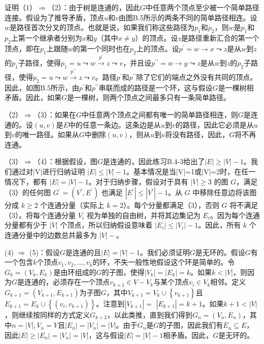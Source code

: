 \documentclass[lang=cn,newtx,10pt,scheme=chinese]{elegantbook}
\begin{document}
证明（1）$\Rightarrow$（2）：由于树是连通的，因此$G$中任意两个顶点至少被一个简单路径连接。假设为了推导矛盾，顶点$u$和$v$由图B.5所示的两条不同的简单路径相连。设$w$是路径首次分叉的顶点。也就是说，如果我们称这些路径为$p_1$和$p_2$，则$w$是$p_1$和$p_2$上第一个继承者分别为$x$和$y$（其中$x \neq y$）的顶点。设$z$是路径重新汇合的第一个顶点，即在$p_1$上跟随$w$的第一个同时也在$p_2$上的顶点。设$p^{\prime}=w \rightarrow x \leadsto z$是从$w$到$z$的$p_1$子路径，使得$p_1=u \leadsto w \stackrel{p^{\prime}}{\rightarrow} z \leadsto v$，并且设$p^{\prime \prime}=w \rightarrow y \leadsto z$是从$w$到$z$的$p_2$子路径，使得$p_2=u \leadsto w \stackrel{p^{\prime \prime}}{\rightarrow} z \leadsto v$。路径$p^{\prime}$和$p^{\prime \prime}$除了它们的端点之外没有共同的顶点。因此，如图B.5所示，由$p^{\prime}$和$p^{\prime \prime}$串联而成的路径是一个环，这与假设$G$是一棵树相矛盾。因此，如果$G$是一棵树，则两个顶点之间最多只有一条简单路径。

（2）$\Rightarrow$（3）：如果在$G$中任意两个顶点之间都有唯一的简单路径相连，则$G$是连通的。设$(u,v)$是$E$中的任意一条边。这条边是从$u$到$v$的路径，因此它必须是从$u$到$v$的唯一路径。如果从$G$中删除$(u,v)$，则从$u$到$v$将没有路径，因此，$G$将不再连通。

（3）$\Rightarrow$（4）：根据假设，图$G$是连通的，因此练习B.4-3给出了$|E| \geq|V|-1$。我们通过对|V|进行归纳证明 $|E| \leq|V|-1$。基本情况是当|V|=1或|V|=2时，在任一情况下，都有 $|E|=|V|-1$。对于归纳步骤，假设对于具有 $|V| \geq 3 $ 的图 $G $，满足（3）的任何图 $G^{\prime}=\left(V^{\prime}, E^{\prime}\right)$ 也满足 $\left|E^{\prime}\right| \leq\left|V^{\prime}\right|-1 $。从 $G $ 中移除任意边将该图分成 $k \geq 2 $ 个连通分量（实际上 $k=2 $）。每个分量都满足（3），否则 $G $ 将不满足（3）。将每个连通分量 $V_i $ 视为单独的自由树，并将其边集记为 $E_i $。因为每个连通分量都有少于 $|V|$ 个顶点，所以归纳假设意味着 $\left|E_i\right| \leq\left|V_i\right|-1 $。因此，所有 $k $ 个连通分量中的边数总共最多为 $|V|-$。

(4) $\Rightarrow$ (5)：假设$G$是连通的且$|E|=|V|-1$。我们必须证明$G$是无环的。假设$G$有一个包含$k$个顶点$v_1, v_2, \ldots, v_k$的环，不失一般性地假设这个环是简单的。令$G_k=\left(V_k, E_k\right)$是由环组成的$G$的子图，使得$\left|V_k\right|=\left|E_k\right|=k$。如果$k<|V|$，则因为$G$是连通的，必须存在一个顶点$v_{k+1} \in V-V_k$与某个顶点$v_i \in V_k$相邻。定义$G_{k+1}=\left(V_{k+1}, E_{k+1}\right)$为子图$G$，其中$V_{k+1}=V_k \cup\left\{v_{k+1}\right\}$且$E_{k+1}=E_k \cup\left\{\left(v_i, v_{k+1}\right)\right\}$。注意到$\left|V_{k+1}\right|=$ $\left|E_{k+1}\right|=k+1$。如果$k+1<|V|$，则继续按同样的方式定义$G_{k+2}$，以此类推，直到我们得到$G_n=\left(V_n, E_n\right)$，其中$n=|V|, V_n=V$且$\left|E_n\right|=\left|V_n\right|=|V|$。由于$G_n$是$G$的子图，因此我们有$E_n \subseteq E$，因此$|E| \geq\left|E_n\right|=\left|V_n\right|=|V|$，这与假设$|E|=|V|-1$相矛盾。因此，$G$是无环的。
\end{document}
